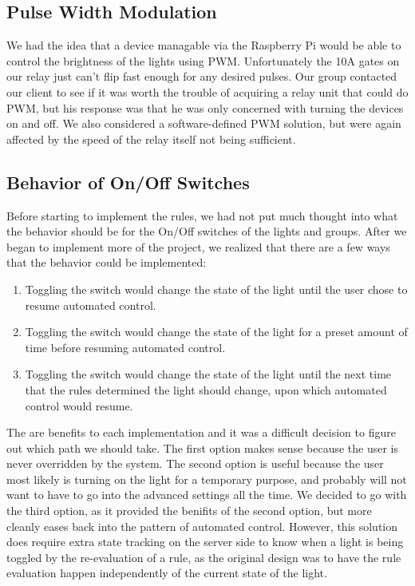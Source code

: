 \documentclass[oneside,openright]{book}
\begin{document}
\subsection{Pulse Width Modulation}

We had the idea that a device managable via the Raspberry Pi would be able to
control the brightness of the lights using PWM. Unfortunately the 10A gates on
our relay just can't flip fast enough for any desired pulses. Our group
contacted our client to see if it was worth the trouble of acquiring a relay
unit that could do PWM, but his response was that he was only concerned with
turning the devices on and off. We also considered a software-defined PWM
solution, but were again affected by the speed of the relay itself not being
sufficient.

\subsection{Behavior of On/Off Switches}

Before starting to implement the rules, we had not put much thought into what
the behavior should be for the On/Off switches of the lights and groups. After
we began to implement more of the project, we realized that there are a few
ways that the behavior could be implemented:

\begin{enumerate}
  \item Toggling the switch would change the state of the light until the user
      chose to resume automated control.
  \item Toggling the switch would change the state of the light for a preset
      amount of time before resuming automated control.
  \item Toggling the switch would change the state of the light until the next
      time that the rules determined the light should change, upon which
      automated control would resume.
\end{enumerate}

The are benefits to each implementation and it was a difficult decision to
figure out which path we should take. The first option makes sense because the
user is never overridden by the system. The second option is useful because the
user most likely is turning on the light for a temporary purpose, and probably
will not want to have to go into the advanced settings all the time. We decided
to go with the third option, as it provided the benifits of the second option,
but more cleanly eases back into the pattern of automated control.  However,
this solution does require extra state tracking on the server side to know when
a light is being toggled by the re-evaluation of a rule, as the original design
was to have the rule evaluation happen independently of the current state of
the light.
\end{document}
